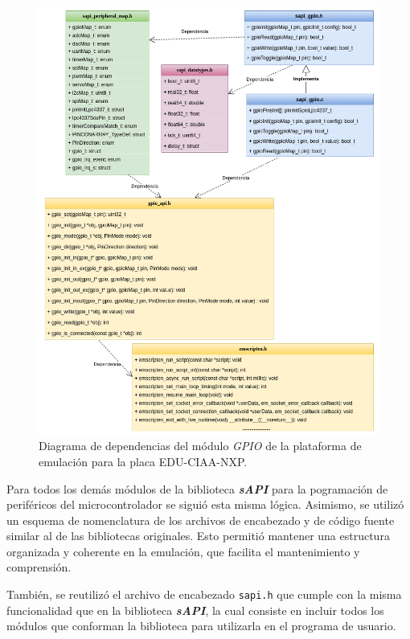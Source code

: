 \hfill \break
\hfill \break
\hfill \break
\hfill \break
\hfill \break
\hfill \break


\begin{figure}[ht]
	\centering
	\includegraphics[scale=.41]{./Figures/DiagramaClasesEmulador.png}
	\caption{Diagrama de dependencias del módulo \textit{GPIO} de la plataforma de emulación para la placa EDU-CIAA-NXP.}
	\label{fig:GPIOEmulador}
\end{figure}


Para todos los demás módulos de la biblioteca \textit{\textbf{sAPI}} para la pogramación de periféricos del microcontrolador se siguió esta misma lógica. Asimismo, se utilizó un esquema de nomenclatura de los archivos de encabezado y de código fuente similar al de las bibliotecas originales.  Esto permitió mantener una estructura organizada y coherente en la emulación, que facilita el mantenimiento y comprensión.


También, se reutilizó el archivo de encabezado \texttt{sapi.h} que cumple con la misma funcionalidad que en la biblioteca \textit{\textbf{sAPI}}, la cual consiste en incluir todos los módulos que conforman la biblioteca para utilizarla en el programa de usuario. 

